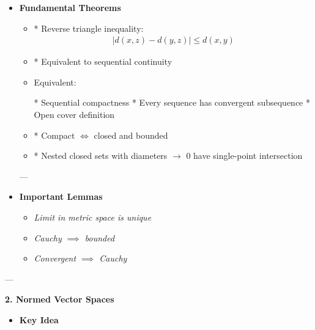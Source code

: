 \documentclass[12pt,a4paper]{report}
\begin{document}
\begin{description}
\begin{itemize}
---

    \item \textbf{Fundamental Theorems}

            \begin{itemize}
            \item \textit{}

  * Reverse triangle inequality:
    \begin{align*}
    |d(x,z)-d(y,z)| \le d(x,y)
    \end{align*}

            \item \textit{}

  * Equivalent to sequential continuity

            \item \textit{}
  Equivalent:

  * Sequential compactness
  * Every sequence has convergent subsequence
  * Open cover definition

            \item \textit{}

  * Compact $\iff$ closed and bounded

            \item \textit{}

  * Nested closed sets with diameters $\to$ 0 have single-point intersection

            \end{itemize}
---

    \item \textbf{Important Lemmas}

            \begin{itemize}
            \item \textit{Limit in metric space is unique}
            \item \textit{Cauchy $\implies$ bounded}
            \item \textit{Convergent $\implies$ Cauchy}
            \end{itemize}
    \end{itemize}

---

\item \textbf{2. Normed Vector Spaces}

    \begin{itemize}
    \item \textbf{Key Idea}


\end{itemize}
\end{description}
\end{document}
